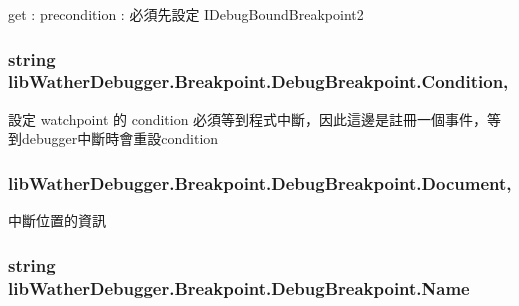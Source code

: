 get \+: precondition \+: 必須先設定 I\+Debug\+Bound\+Breakpoint2 

\hypertarget{classlib_wather_debugger_1_1_breakpoint_1_1_debug_breakpoint_a0d15306b4bb449b26349a5157f09e56c}{
\subsubsection[{Condition}]{\setlength{\rightskip}{0pt plus 5cm}string lib\+Wather\+Debugger.\+Breakpoint.\+Debug\+Breakpoint.\+Condition\hspace{0.3cm}{\ttfamily [get]}, {\ttfamily [set]}}}\label{classlib_wather_debugger_1_1_breakpoint_1_1_debug_breakpoint_a0d15306b4bb449b26349a5157f09e56c}


設定 watchpoint 的 condition 必須等到程式中斷，因此這邊是註冊一個事件，等到debugger中斷時會重設condition 

\hypertarget{classlib_wather_debugger_1_1_breakpoint_1_1_debug_breakpoint_ad092a98bbf28e58b970d0319a74e4cfd}{
\subsubsection[{Document}]{ lib\+Wather\+Debugger.\+Breakpoint.\+Debug\+Breakpoint.\+Document\hspace{0.3cm}{\ttfamily [get]}, {\ttfamily [set]}}}\label{classlib_wather_debugger_1_1_breakpoint_1_1_debug_breakpoint_ad092a98bbf28e58b970d0319a74e4cfd}


中斷位置的資訊 

\hypertarget{classlib_wather_debugger_1_1_breakpoint_1_1_debug_breakpoint_a4d64af3bc9dab8958c05a456023f4d04}{
\subsubsection[{Name}]{\setlength{\rightskip}{0pt plus 5cm}string lib\+Wather\+Debugger.\+Breakpoint.\+Debug\+Breakpoint.\+Name\hspace{0.3cm}{\ttfamily [get]}}}\label{classlib_wather_debugger_1_1_breakpoint_1_1_debug_breakpoint_a4d64af3bc9dab8958c05a456023f4d04}




